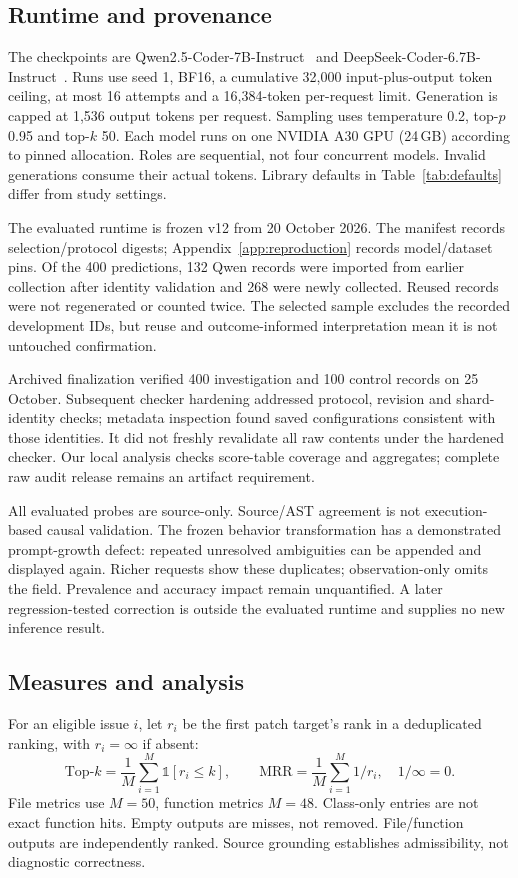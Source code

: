 \subsection{Runtime and provenance}\label{sec:implementation}
The checkpoints are Qwen2.5-Coder-7B-Instruct~\citep{qwen25coder2024} and DeepSeek-Coder-6.7B-Instruct~\citep{deepseekcoder2024}. Runs use seed 1, BF16, a cumulative 32,000 input-plus-output token ceiling, at most 16 attempts and a 16,384-token per-request limit. Generation is capped at 1,536 output tokens per request. Sampling uses temperature 0.2, top-$p$ 0.95 and top-$k$ 50. Each model runs on one NVIDIA A30 GPU (24\,GB) according to pinned allocation. Roles are sequential, not four concurrent models. Invalid generations consume their actual tokens. Library defaults in Table~\ref{tab:defaults} differ from study settings.

The evaluated runtime is frozen v12 from 20 October 2026. The manifest records selection/protocol digests; Appendix~\ref{app:reproduction} records model/dataset pins. Of the 400 predictions, 132 Qwen records were imported from earlier collection after identity validation and 268 were newly collected. Reused records were not regenerated or counted twice. The selected sample excludes the recorded development IDs, but reuse and outcome-informed interpretation mean it is not untouched confirmation.

Archived finalization verified 400 investigation and 100 control records on 25 October. Subsequent checker hardening addressed protocol, revision and shard-identity checks; metadata inspection found saved configurations consistent with those identities. It did not freshly revalidate all raw contents under the hardened checker. Our local analysis checks score-table coverage and aggregates; complete raw audit release remains an artifact requirement.

All evaluated probes are source-only. Source/AST agreement is not execution-based causal validation. The frozen behavior transformation has a demonstrated prompt-growth defect: repeated unresolved ambiguities can be appended and displayed again. Richer requests show these duplicates; observation-only omits the field. Prevalence and accuracy impact remain unquantified. A later regression-tested correction is outside the evaluated runtime and supplies no new inference result.

\subsection{Measures and analysis}
For an eligible issue $i$, let $r_i$ be the first patch target's rank in a deduplicated ranking, with $r_i=\infty$ if absent:
\begin{equation}\label{eq:metrics}
\mathrm{Top}\mbox{-}k=\frac{1}{M}\sum_{i=1}^{M}\mathbb{1}[r_i\le k],
\qquad
\mathrm{MRR}=\frac{1}{M}\sum_{i=1}^{M}1/r_i,\quad 1/\infty=0.
\end{equation}
File metrics use $M=50$, function metrics $M=48$. Class-only entries are not exact function hits. Empty outputs are misses, not removed. File/function outputs are independently ranked. Source grounding establishes admissibility, not diagnostic correctness.

